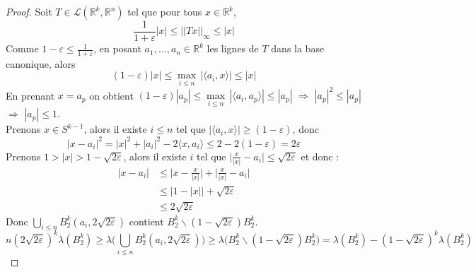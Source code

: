 \documentclass[12pt]{article}
\theoremstyle{definition}
\begin{document}
\begin{proof}
	Soit $T\in \mathcal{L}(\mathbb{R}^k,\mathbb{R}^n)$ tel que pour tous $x\in\mathbb{R}^k$,
	\begin{equation*}
	\frac{1}{1+\varepsilon}|x|\leq ||T x||_\infty \leq |x|
	\end{equation*}
	Comme $1-\varepsilon\leq \frac{1}{1+\varepsilon}$, en posant $a_1,\dots,a_n\in\mathbb{R}^k$ les lignes de $T$ dans la base canonique, alors 
	\begin{equation*}
	(1-\varepsilon)|x|\leq \underset{i\leq n}{\max}\,|\langle a_i,x\rangle|\leq |x|
	\end{equation*}
	En prenant $x=a_p$ on obtient $(1-\varepsilon)|a_p|\leq\underset{i\leq n}{\max}\,|\langle a_i,a_p\rangle|  \leq |a_p| $ $\Rightarrow$ $|a_p|^2\leq|a_p|$ $\Rightarrow$ $|a_p|\leq 1$.\\
	Prenons $x\in S^{k-1}$, alors il existe $i\leq n$ tel que $|\langle a_i,x \rangle |\geq (1-\varepsilon)$, donc 
	\begin{equation*}
	|x-a_i|^2=|x|^2+|a_i|^2-2\langle x,a_i \rangle \leq 2-2(1-\varepsilon)=2\varepsilon
	\end{equation*}
	Prenons $1>|x|>1-\sqrt{2\varepsilon}$, alors il existe $i$ tel que $\big|\frac{x}{|x|}-a_i\big|\leq \sqrt{2\varepsilon}$ et donc :
	\begin{align*}
	|x-a_i|&\leq \big|x-\frac{x}{|x|}\big|+\big|\frac{x}{|x|}-a_i\big|\\
	&\leq \big|1-|x|\big|+\sqrt{2\varepsilon}\\
	&\leq 2\sqrt{2\varepsilon}
	\end{align*}
	Donc $\bigcup_{i\leq n}B^k_2(a_i,2\sqrt{2\varepsilon})$ contient $B^k_2\backslash (1-\sqrt{2\varepsilon})B^k_2$.
	\begin{equation*}
	n(2\sqrt{2\varepsilon})^k\lambda(B^k_2) \geq	\lambda\big(\bigcup_{i\leq n}B^k_2(a_i,2\sqrt{2\varepsilon})\big)\geq \lambda\big(B^k_2\backslash (1-\sqrt{2\varepsilon})B^k_2\big) =\lambda(B^k_2)-(1-\sqrt{2\varepsilon})^k\lambda(B^k_2)
	\end{equation*}
	

\end{proof}
\end{document}
